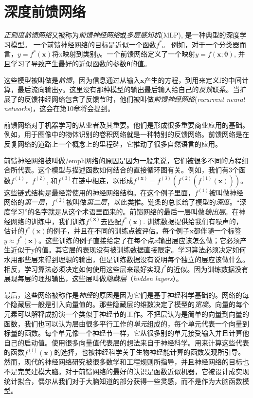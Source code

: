 \chapter{深度前馈网络}
\label{chap:6}

\emph{正则度前馈网络}又被称为\emph{前馈神经网络}或\emph{多层感知机}(MLP), 是一种典型的深度学习模型。
一个前馈神经网络的目标是近似一个函数$f^*$。
例如，对于一个分类器而言，$y=f^*(\bm{x})$将x映射到类别$y$。一个前馈网络定义了一个映射$y=f(\bm{x};\bm{\theta})$, 并且学习了导致产生最好的近似函数的参数$\bm{\theta}$的值。

这些模型被叫做是\emph{前馈}，因为信息通过从输入$\bm{x}$产生的方程，到用来定义f的中间计算，最后流向输出$\bm{y}$。这里没有那种模型的输出最后输入给自己的\emph{反馈}联系。当扩展了的反馈神经网络包含了反馈节时，他们被叫做\emph{前馈神经网络}(\emph{recurrent neural networks})，这会在第10章将会提到。

前馈网络对于机器学习的从业者及其重要。他们是形成很多重要商业应用的基础。例如，用于图像中的物体识别的卷积网络就是一种特别的反馈网络。前馈网络是在反复网络的道路上一个概念上的里程碑，它推动了很多自然语言的应用。

前馈神经网络被叫做/emph{网络}的原因是因为一般来说，它们被很多不同的方程组合所代表。这个模型与描述函数如何结合的直接循环图有关。例如，我们有3个函数$f^{(1)}$，$f^{(2)}$, 和$f^{(3)}$在链中相连，以形成$f^{(\bm{x})}=f^{(3)}(f^{(2)}(f^{(1)}(\bm{x})))$。
这些链式结构是最经常使用的神经网络结构。在这个例子里面，$f^{(1)}$被叫做神经网络的\emph{第一层}，$f^{(2)}$被叫做\emph{第二层}，以此类推。链条的总长给了模型的\emph{深度}。“深度学习”的名字就是从这个术语里面来的。前馈网络的最后一层叫做\emph{输出层}。在神经网络的训练中，我们训练$f^{(\bm{x})}$去匹配$f^*{(\bm{x})}$. 训练数据提供给我们有噪声的，估计的$f^*{(\bm{x})}$的例子，并且在不同的训练点被评估。每个例子$\bm{x}$都伴随一个标签$y\approx f^*(\bm{x})$。这些训练的例子直接给定了在每个点$x$输出层应该怎么做；它必须产生近似于y的值。其它层的表现没有被训练数据直接限定。学习算法必须决定如何水用那些层来得到理想的输出，但是训练数据没有说明每个独立的层应该做什么。相反，学习算法必须决定如何使用这些层来最好实现$f^*$的近似。因为训练数据没有展现每层的理想输出，这些层叫做\emph{隐藏层}（\emph{hidden layers}）。

最后，这些网络被称作是\emph{神经}的原因是因为它们是基于神经科学基础的。网络的每个隐藏层一般是引入向量值的。那些隐藏层的维数决定了模型的\emph{宽度}。向量的每个元素可以解释成扮演一个类似于神经节的工作。不把层认为是简单的向量到向量的函数，我们也可以认为层由很多平行工作的\emph{单元}组成的，每个单元代表一个向量到标量的函数。每个单元像一个神经节一样，它从很多别的单元接受输入并且计算他自己的启动值。使用很多向量值代表层的想法来自于神经科学。用来计算这些代表的函数$f^(i)(\bm{x})$的选择，也被神经科学关于生物神经能计算的函数发现所引导。然而，现代的神经网络研究被很多数学和工程规则所指导，并且神经网络的目标也不是完美建模大脑。对于前馈网络的最好的认识是函数近似机器，它被设计成实现统计拟合，偶尔从我们对于大脑知道的部分获得一些灵感，而不是作为大脑函数模型。

